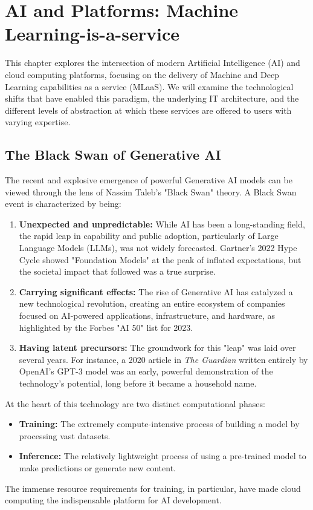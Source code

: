 \chapter{AI and Platforms: Machine Learning-is-a-service}
\label{chap:mlaas}

This chapter explores the intersection of modern Artificial Intelligence (AI) and cloud computing platforms, focusing on the delivery of Machine and Deep Learning capabilities as a service (MLaaS). We will examine the technological shifts that have enabled this paradigm, the underlying IT architecture, and the different levels of abstraction at which these services are offered to users with varying expertise.

\section{The Black Swan of Generative AI}

The recent and explosive emergence of powerful Generative AI models can be viewed through the lens of Nassim Taleb's "Black Swan" theory. A Black Swan event is characterized by being:
\begin{enumerate}
    \item \textbf{Unexpected and unpredictable:} While AI has been a long-standing field, the rapid leap in capability and public adoption, particularly of Large Language Models (LLMs), was not widely forecasted. Gartner's 2022 Hype Cycle showed "Foundation Models" at the peak of inflated expectations, but the societal impact that followed was a true surprise.
    \item \textbf{Carrying significant effects:} The rise of Generative AI has catalyzed a new technological revolution, creating an entire ecosystem of companies focused on AI-powered applications, infrastructure, and hardware, as highlighted by the Forbes "AI 50" list for 2023.
    \item \textbf{Having latent precursors:} The groundwork for this "leap" was laid over several years. For instance, a 2020 article in \textit{The Guardian} written entirely by OpenAI's GPT-3 model was an early, powerful demonstration of the technology's potential, long before it became a household name.
\end{enumerate}

At the heart of this technology are two distinct computational phases:
\begin{itemize}
    \item \textbf{Training:} The extremely compute-intensive process of building a model by processing vast datasets.
    \item \textbf{Inference:} The relatively lightweight process of using a pre-trained model to make predictions or generate new content.
\end{itemize}
The immense resource requirements for training, in particular, have made cloud computing the indispensable platform for AI development.

